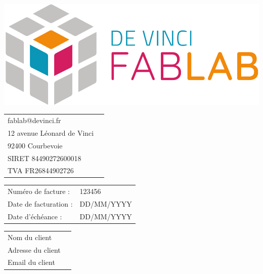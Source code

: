 \documentclass[12pt,a4paper]{article}
\begin{document}
\begin{minipage}{0.4\textwidth}
    \includegraphics[width=0.6\linewidth]{../assets/logo_fablab.png}

    \vspace{0.5cm}

    \begin{tabular}{ll}
        fablab@devinci.fr          \\
        12 avenue Léonard de Vinci \\
        92400 Courbevoie           \\
        SIRET 84490272600018       \\
        TVA  FR26844902726         \\
    \end{tabular}
\end{minipage}
\begin{minipage}{0.5\textwidth}
    \begin{flushright}
        \begin{tabular}{ll}
            Numéro de facture :   & 123456     \\
            Date de facturation : & DD/MM/YYYY \\
            Date d'échéance :     & DD/MM/YYYY \\
        \end{tabular}
    \end{flushright}
\end{minipage}
\begin{flushright}
    \begin{minipage}[t]{0.5\textwidth}
        \begin{framed}
            \begin{tabular}{ll}
                Nom du client     \\
                Adresse du client \\
                Email du client   \\
            \end{tabular}
        \end{framed}
    \end{minipage}
\end{flushright}
\hfill
\end{document}
